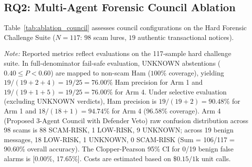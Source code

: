 \documentclass[journal]{IEEEtran}
\begin{document}
\subsection{RQ2: Multi-Agent Forensic Council Ablation}
\label{subsec:res_rq2}

Table~\ref{tab:ablation_council} assesses council configurations on the Hard Forensic Challenge Suite ($N=117$: $98$ scam lures, $19$ authentic transactional notices).

\begin{table}[t]
\centering
\caption{Empirical Performance, Per-Class Metrics, and Cost Matrix on Hard Forensic Challenge Suite ($N=117$, 98 Scam, 19 Benign)}
\label{tab:ablation_council}
\renewcommand{\arraystretch}{0.92}
\par\vspace{6pt}
\parbox{\textwidth}{\footnotesize \textit{Note:} Reported metrics reflect evaluations on the 117-sample hard challenge suite. In full-denominator fail-safe evaluation, UNKNOWN abstentions ($0.40 \le P < 0.60$) are mapped to non-scam Ham ($100\%$ coverage), yielding $19/(19 + 2 + 4) = 19/25 = 76.00\%$ Ham precision for Arm 1 and $19/(19 + 1 + 5) = 19/25 = 76.00\%$ for Arm 4. Under selective evaluation (excluding UNKNOWN verdicts), Ham precision is $19/(19+2) = 90.48\%$ for Arm 1 and $18/(18+1) = 94.74\%$ for Arm 4 ($96.58\%$ coverage). Arm 4 (Proposed 3-Agent Council with Defender Veto) raw confusion distribution across 98 scams is 88 SCAM-RISK, 1 LOW-RISK, 9 UNKNOWN; across 19 benign messages, 18 LOW-RISK, 1 UNKNOWN, 0 SCAM-RISK (Sum = 106/117 = 90.60\% overall accuracy). The Clopper-Pearson 95\% CI for 0/19 benign false alarms is [0.00\%, 17.65\%]. Costs are estimated based on $\$0.15/1\text{k}$ unit calls.}
\end{table}
\end{document}
